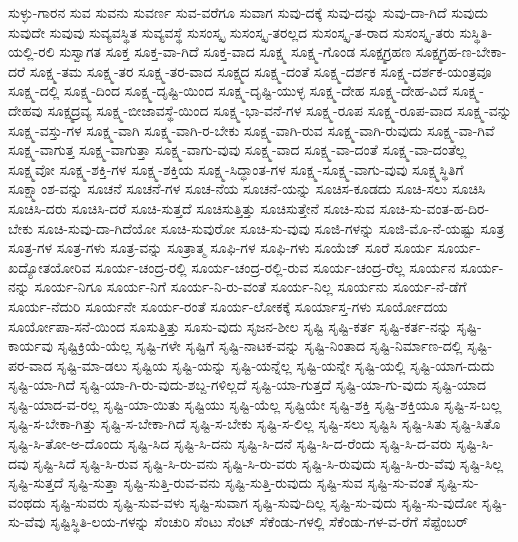 {ಸುಳ್ಳು-ಗಾರನ
ಸುವ
ಸುವನು
ಸುವರ್ಣ
ಸುವ-ವರೆಗೂ
ಸುವಾಗ
ಸುವು-ದಕ್ಕೆ
ಸುವು-ದನ್ನು
ಸುವು-ದಾ-ಗಿದೆ
ಸುವುದು
ಸುವುದೇ
ಸುವುವು
ಸುವ್ಯವಸ್ಥಿತ
ಸುವ್ಯವಸ್ಥೆ
ಸುಸಂಸ್ಕೃ
ಸುಸಂಸ್ಕೃ-ತರಲ್ಲದ
ಸುಸಂಸ್ಕೃ-ತ-ರಾದ
ಸುಸಂಸ್ಕೃ-ತರು
ಸುಸ್ಥಿತಿ-ಯಲ್ಲಿ-ರಲಿ
ಸುಸ್ವಾಗತ
ಸೂಕ್ತ
ಸೂಕ್ತ-ವಾ-ಗಿದೆ
ಸೂಕ್ತ-ವಾದ
ಸೂಕ್ಷ್ಮ
ಸೂಕ್ಷ್ಮ-ಗೊಂಡ
ಸೂಕ್ಷ್ಮಗ್ರಹಣ
ಸೂಕ್ಷ್ಮಗ್ರಹ-ಣ-ಬೇಕಾ-ದರೆ
ಸೂಕ್ಷ್ಮ-ತಮ
ಸೂಕ್ಷ್ಮ-ತರ
ಸೂಕ್ಷ್ಮ-ತರ-ವಾದ
ಸೂಕ್ಷ್ಮದ
ಸೂಕ್ಷ್ಮ-ದಂತೆ
ಸೂಕ್ಷ್ಮ-ದರ್ಶಕ
ಸೂಕ್ಷ್ಮ-ದರ್ಶಕ-ಯಂತ್ರವೂ
ಸೂಕ್ಷ್ಮ-ದಲ್ಲಿ
ಸೂಕ್ಷ್ಮ-ದಿಂದ
ಸೂಕ್ಷ್ಮ-ದೃಷ್ಟಿ-ಯಿಂದ
ಸೂಕ್ಷ್ಮ-ದೃಷ್ಟಿ-ಯುಳ್ಳ
ಸೂಕ್ಷ್ಮ-ದೇಹ
ಸೂಕ್ಷ್ಮ-ದೇಹ-ವಿದೆ
ಸೂಕ್ಷ್ಮ-ದೇಹವು
ಸೂಕ್ಷ್ಮದ್ರವ್ಯ
ಸೂಕ್ಷ್ಮ-ಬೀಜಾವಸ್ಥೆ-ಯಿಂದ
ಸೂಕ್ಷ್ಮ-ಭಾ-ವನೆ-ಗಳ
ಸೂಕ್ಷ್ಮ-ರೂಪ
ಸೂಕ್ಷ್ಮ-ರೂಪ-ವಾದ
ಸೂಕ್ಷ್ಮ-ವನ್ನು
ಸೂಕ್ಷ್ಮ-ವಸ್ತು-ಗಳ
ಸೂಕ್ಷ್ಮ-ವಾಗಿ
ಸೂಕ್ಷ್ಮ-ವಾಗಿ-ರ-ಬೇಕು
ಸೂಕ್ಷ್ಮ-ವಾಗಿ-ರುವ
ಸೂಕ್ಷ್ಮ-ವಾಗಿ-ರುವುದು
ಸೂಕ್ಷ್ಮ-ವಾ-ಗಿವೆ
ಸೂಕ್ಷ್ಮ-ವಾಗುತ್ತ
ಸೂಕ್ಷ್ಮ-ವಾಗುತ್ತಾ
ಸೂಕ್ಷ್ಮ-ವಾಗು-ವುವು
ಸೂಕ್ಷ್ಮ-ವಾದ
ಸೂಕ್ಷ್ಮ-ವಾ-ದಂತೆ
ಸೂಕ್ಷ್ಮ-ವಾ-ದಂತೆಲ್ಲ
ಸೂಕ್ಷ್ಮವೋ
ಸೂಕ್ಷ್ಮ-ಶಕ್ತಿ-ಗಳ
ಸೂಕ್ಷ್ಮ-ಶಕ್ತಿಯ
ಸೂಕ್ಷ್ಮ-ಸಿದ್ಧಾಂತ-ಗಳ
ಸೂಕ್ಷ್ಮ-ಸೂಕ್ಷ್ಮ-ವಾಗು-ವುವು
ಸೂಕ್ಷ್ಮಸ್ಥಿತಿಗೆ
ಸೂಕ್ಷ್ಮಾಂಶ-ವನ್ನು
ಸೂಚನೆ
ಸೂಚನೆ-ಗಳ
ಸೂಚ-ನೆಯ
ಸೂಚನೆ-ಯನ್ನು
ಸೂಚಿಸ-ಕೂಡದು
ಸೂಚಿ-ಸಲು
ಸೂಚಿಸಿ
ಸೂಚಿಸಿ-ದರು
ಸೂಚಿಸಿ-ದರೆ
ಸೂಚಿ-ಸುತ್ತದೆ
ಸೂಚಿಸುತ್ತಿತ್ತು
ಸೂಚಿಸುತ್ತೇನೆ
ಸೂಚಿ-ಸುವ
ಸೂಚಿ-ಸು-ವಂತ-ಹ-ದಿರ-ಬೇಕು
ಸೂಚಿ-ಸುವು-ದಾ-ಗಿದೆಯೋ
ಸೂಚಿ-ಸುವುರೋ
ಸೂಚಿ-ಸು-ವುವು
ಸೂಜಿ-ಗಳನ್ನು
ಸೂಜಿ-ಮೊ-ನೆ-ಯಷ್ಟು
ಸೂತ್ರ
ಸೂತ್ರ-ಗಳ
ಸೂತ್ರ-ಗಳು
ಸೂತ್ರ-ವನ್ನು
ಸೂತ್ರಾತ್ಮ
ಸೂಫಿ-ಗಳ
ಸೂಫಿ-ಗಳು
ಸೂಯೆಜ್
ಸೂರೆ
ಸೂರ್ಯ
ಸೂರ್ಯ-ಖದ್ಯೋತಯೋರಿವ
ಸೂರ್ಯ-ಚಂದ್ರ-ರಲ್ಲಿ
ಸೂರ್ಯ-ಚಂದ್ರ-ರಲ್ಲಿ-ರುವ
ಸೂರ್ಯ-ಚಂದ್ರ-ರೆಲ್ಲ
ಸೂರ್ಯನ
ಸೂರ್ಯ-ನನ್ನು
ಸೂರ್ಯ-ನಿಗೂ
ಸೂರ್ಯ-ನಿಗೆ
ಸೂರ್ಯ-ನಿ-ರು-ವಂತೆ
ಸೂರ್ಯ-ನಿಲ್ಲ
ಸೂರ್ಯನು
ಸೂರ್ಯ-ನೆ-ಡೆಗೆ
ಸೂರ್ಯ-ನೆದುರಿ
ಸೂರ್ಯನೇ
ಸೂರ್ಯ-ರಂತೆ
ಸೂರ್ಯ-ಲೋಕಕ್ಕೆ
ಸೂರ್ಯಾಸ್ತ-ಗಳು
ಸೂರ್ಯೋದಯ
ಸೂರ್ಯೋಪಾ-ಸನೆ-ಯಿಂದ
ಸೂಸುತ್ತಿತ್ತು
ಸೂಸು-ವುದು
ಸೃಜನ-ಶೀಲ
ಸೃಷ್ಟಿ
ಸೃಷ್ಟಿ-ಕರ್ತ
ಸೃಷ್ಟಿ-ಕರ್ತ-ನನ್ನು
ಸೃಷ್ಟಿ-ಕಾರ್ಯವು
ಸೃಷ್ಟಿಕ್ರಿಯೆ-ಯೆಲ್ಲ
ಸೃಷ್ಟಿ-ಗಳೇ
ಸೃಷ್ಟಿಗೆ
ಸೃಷ್ಟಿ-ನಾಟಕ-ವನ್ನು
ಸೃಷ್ಟಿ-ನಿಂತಾದ
ಸೃಷ್ಟಿ-ನಿರ್ಮಾಣ-ದಲ್ಲಿ
ಸೃಷ್ಟಿ-ಪರ-ವಾದ
ಸೃಷ್ಟಿ-ಮಾ-ಡಲು
ಸೃಷ್ಟಿಯ
ಸೃಷ್ಟಿ-ಯನ್ನು
ಸೃಷ್ಟಿ-ಯನ್ನೆಲ್ಲ
ಸೃಷ್ಟಿ-ಯನ್ನೇ
ಸೃಷ್ಟಿ-ಯಲ್ಲಿ
ಸೃಷ್ಟಿ-ಯಾಗ-ದುದು
ಸೃಷ್ಟಿ-ಯಾ-ಗಿದೆ
ಸೃಷ್ಟಿ-ಯಾ-ಗಿ-ರು-ವುದು-ಶಬ್ದ-ಗಳಿಲ್ಲದೆ
ಸೃಷ್ಟಿ-ಯಾ-ಗುತ್ತದೆ
ಸೃಷ್ಟಿ-ಯಾ-ಗು-ವುದು
ಸೃಷ್ಟಿ-ಯಾದ
ಸೃಷ್ಟಿ-ಯಾದ-ವ-ರಲ್ಲ
ಸೃಷ್ಟಿ-ಯಾ-ಯಿತು
ಸೃಷ್ಟಿಯು
ಸೃಷ್ಟಿ-ಯೆಲ್ಲ
ಸೃಷ್ಟಿಯೇ
ಸೃಷ್ಟಿ-ಶಕ್ತಿ
ಸೃಷ್ಟಿ-ಶಕ್ತಿಯೂ
ಸೃಷ್ಟಿ-ಸ-ಬಲ್ಲ
ಸೃಷ್ಟಿ-ಸ-ಬೇಕಾ-ಗಿತ್ತು
ಸೃಷ್ಟಿ-ಸ-ಬೇಕಾ-ಗಿದೆ
ಸೃಷ್ಟಿ-ಸ-ಬೇಕು
ಸೃಷ್ಟಿ-ಸ-ಲಿಲ್ಲ
ಸೃಷ್ಟಿ-ಸಲು
ಸೃಷ್ಟಿಸಿ
ಸೃಷ್ಟಿ-ಸಿತು
ಸೃಷ್ಟಿ-ಸಿತೊ
ಸೃಷ್ಟಿ-ಸಿ-ತೋ-ಅ-ದೊಂದು
ಸೃಷ್ಟಿ-ಸಿದ
ಸೃಷ್ಟಿ-ಸಿ-ದನು
ಸೃಷ್ಟಿ-ಸಿ-ದನೆ
ಸೃಷ್ಟಿ-ಸಿ-ದ-ರೆಂದು
ಸೃಷ್ಟಿ-ಸಿ-ದ-ವರು
ಸೃಷ್ಟಿ-ಸಿ-ದವು
ಸೃಷ್ಟಿ-ಸಿದೆ
ಸೃಷ್ಟಿ-ಸಿ-ರುವ
ಸೃಷ್ಟಿ-ಸಿ-ರು-ವನು
ಸೃಷ್ಟಿ-ಸಿ-ರು-ವರು
ಸೃಷ್ಟಿ-ಸಿ-ರುವುದು
ಸೃಷ್ಟಿ-ಸಿ-ರು-ವೆವು
ಸೃಷ್ಟಿ-ಸಿಲ್ಲ
ಸೃಷ್ಟಿ-ಸುತ್ತದೆ
ಸೃಷ್ಟಿ-ಸುತ್ತಾ
ಸೃಷ್ಟಿ-ಸುತ್ತಿ-ರುವ-ವನು
ಸೃಷ್ಟಿ-ಸುತ್ತಿ-ರುವುದು
ಸೃಷ್ಟಿ-ಸುವ
ಸೃಷ್ಟಿ-ಸು-ವಂತೆ
ಸೃಷ್ಟಿ-ಸು-ವಂಥದು
ಸೃಷ್ಟಿ-ಸುವರು
ಸೃಷ್ಟಿ-ಸುವ-ವಳು
ಸೃಷ್ಟಿ-ಸುವಾಗ
ಸೃಷ್ಟಿ-ಸುವು-ದಿಲ್ಲ
ಸೃಷ್ಟಿ-ಸು-ವುದು
ಸೃಷ್ಟಿ-ಸು-ವುದೋ
ಸೃಷ್ಟಿ-ಸು-ವೆವು
ಸೃಷ್ಟಿಸ್ಥಿತಿ-ಲಯ-ಗಳನ್ನು
ಸೆಂಚುರಿ
ಸೆಂಟು
ಸೆಂಟ್
ಸೆಕೆಂಡು-ಗಳಲ್ಲಿ
ಸೆಕೆಂಡು-ಗಳ-ವ-ರೆಗೆ
ಸೆಪ್ಟೆಂಬರ್
}
